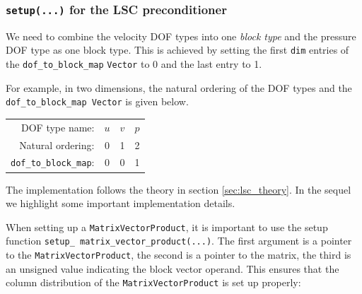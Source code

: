 \subsubsection{\texttt{setup(...)} for the LSC preconditioner\label{sec:lsc_implementation_setup}}
We need to combine the velocity DOF types into one \emph{block type} and the
pressure DOF type as one block type. This is achieved by setting the first
\texttt{dim} entries of the \texttt{dof\_\allowbreak to\_\allowbreak block\_\allowbreak map}
\texttt{Vector} to 0 and the last entry to 1.

For example, in two dimensions, the natural ordering of the DOF types and the
\texttt{dof\_\allowbreak to\_\allowbreak block\_\allowbreak map \allowbreak Vector} is given below.
\begin{center}
    \begin{tabular}{ | r | c c c |}
    \hline
    DOF type name: & $u$ & $v$ & $p$ \\ 
    Natural ordering: & 0 & 1 & 2 \\ 
    \texttt{dof\_\allowbreak to\_\allowbreak block\_\allowbreak map}: & 0 & 0 & 1 \\ 
    \hline
    \end{tabular}
\end{center}
The implementation follows the theory in section \ref{sec:lsc_theory}. In the
sequel we highlight some important implementation details. 

When setting up a \texttt{Matrix\allowbreak Vector\allowbreak Product}, it is
important to use the setup function \texttt{setup\_\allowbreak
  matrix\_\allowbreak vector\_\allowbreak product(...)}.  The first argument is
a pointer to the \texttt{Matrix\allowbreak Vector\allowbreak Product}, the
second is a pointer to the matrix, the third is an unsigned value indicating
the block vector operand. This ensures that the column distribution of the
\texttt{Matrix\allowbreak Vector\allowbreak Product} is set up properly:


